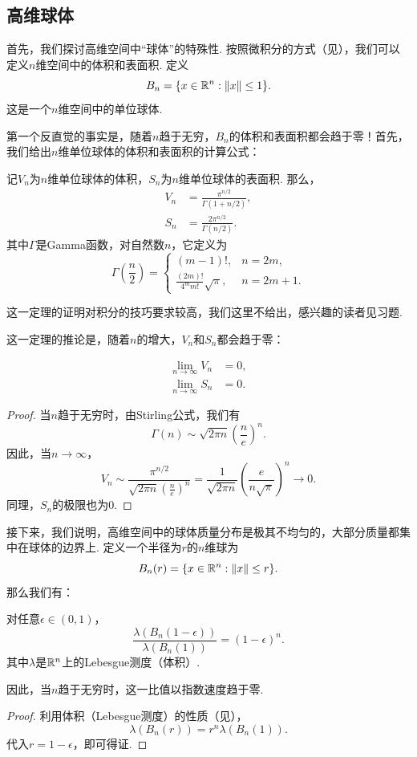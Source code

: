 \subsection{高维球体}
首先，我们探讨高维空间中“球体”的特殊性. 按照微积分的方式（见），我们可以定义$n$维空间中的体积和表面积. 定义
\[B_n = \{x \in \mathbb{R}^n: \left\|x\right\| \leq 1\}.\]
这是一个$n$维空间中的单位球体. 

第一个反直觉的事实是，随着$n$趋于无穷，$B_n$的体积和表面积都会趋于零！首先，我们给出$n$维单位球体的体积和表面积的计算公式：

\begin{theorem}
记$V_n$为$n$维单位球体的体积，$S_n$为$n$维单位球体的表面积. 那么，
\begin{align*}
    V_n&=\frac{\pi^{n/2}}{\Gamma(1+n/2)},\\
    S_n&=\frac{2\pi^{n/2}}{\Gamma(n/2)}.
\end{align*}
其中$\Gamma$是Gamma函数，对自然数$n$，它定义为
\[\Gamma\left(\frac{n}{2}\right)=\begin{cases}
    (m-1)!, & n=2m,\\
    \frac{(2m)!}{4^mm!}\sqrt{\pi}, & n=2m+1.
\end{cases}
\]
\end{theorem}
这一定理的证明对积分的技巧要求较高，我们这里不给出，感兴趣的读者见习题. 

这一定理的推论是，随着$n$的增大，$V_n$和$S_n$都会趋于零：

\begin{corollary}
\begin{align*}
    \lim_{n\to\infty} V_n&=0,\\
    \lim_{n\to\infty} S_n&=0.
\end{align*}
\end{corollary}
\begin{proof}
    当$n$趋于无穷时，由Stirling公式，我们有
        \[\Gamma(n)\sim\sqrt{2\pi n}\left(\frac{n}{e}\right)^n.\]
    因此，当$n\to\infty$，
    \[V_n\sim\frac{\pi^{n/2}}{\sqrt{2\pi n}\left(\frac{n}{e}\right)^n}=\frac{1}{\sqrt{2\pi n}}\left(\frac{e}{n\sqrt{\pi}}\right)^n\to 0.\]
    同理，$S_n$的极限也为$0$.
\end{proof}

接下来，我们说明，高维空间中的球体质量分布是极其不均匀的，大部分质量都集中在球体的边界上. 定义一个半径为$r$的$n$维球为
\[B_n(r) = \{x \in \mathbb{R}^n: \left\|x\right\| \leq r\}.\]
那么我们有：
\begin{proposition}
对任意$\epsilon\in(0,1)$，
\[\frac{\lambda(B_n(1-\epsilon))}{\lambda(B_n(1))}=(1-\epsilon)^n.\]
其中$\lambda$是$\mathbb{R}^n$上的Lebesgue测度（体积）. 

因此，当$n$趋于无穷时，这一比值以指数速度趋于零. 
\end{proposition}
\begin{proof}
    利用体积（Lebesgue测度）的性质（见），
    \[\lambda(B_n(r))=r^n\lambda(B_n(1)).\]
    代入$r=1-\epsilon$，即可得证.
\end{proof}

